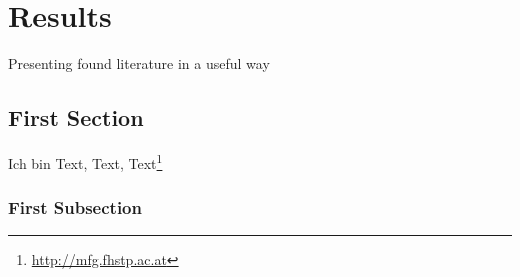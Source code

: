 \chapter{Results}
\label{ch:results}

Presenting found literature in a useful way

\section{First Section}
Ich bin Text, Text, Text\footnote{\url{http://mfg.fhstp.ac.at}}


\subsection{First Subsection}